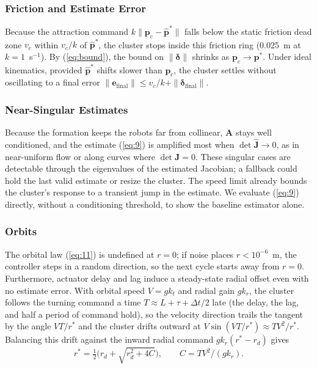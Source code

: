 \documentclass[lettersize,journal]{IEEEtran}
\begin{document}
\subsubsection{Friction and Estimate Error}
Because the attraction command $k\|\mathbf{p}_c - \hat{\mathbf{p}}^*\|$ falls below the static friction dead zone $v_c$ within $v_c/k$ of $\hat{\mathbf{p}}^*$, the cluster stops inside this friction ring (0.025~m at $k = 1$~s$^{-1}$). By (\ref{eq:bound}), the bound on $\|\boldsymbol{\delta}\|$ shrinks as $\mathbf{p}_c \to \mathbf{p}^*$. Under ideal kinematics, provided $\hat{\mathbf{p}}^*$ shifts slower than $\mathbf{p}_c$, the cluster settles without oscillating to a final error $\|\mathbf{e}_{\text{final}}\| \le v_c/k + \|\boldsymbol{\delta}_{\text{final}}\|$.

\subsubsection{Near-Singular Estimates}
Because the formation keeps the robots far from collinear, $\mathbf{A}$ stays well conditioned, and the estimate (\ref{eq:9}) is amplified most when $\det\hat{\mathbf{J}} \to 0$, as in near-uniform flow or along curves where $\det\mathbf{J} = 0$. These singular cases are detectable through the eigenvalues of the estimated Jacobian; a fallback could hold the last valid estimate or resize the cluster. The speed limit already bounds the cluster's response to a transient jump in the estimate. We evaluate (\ref{eq:9}) directly, without a conditioning threshold, to show the baseline estimator alone.

\subsubsection{Orbits}
The orbital law (\ref{eq:11}) is undefined at $r = 0$; if noise places $r < 10^{-6}$~m, the controller steps in a random direction, so the next cycle starts away from $r = 0$. Furthermore, actuator delay and lag induce a steady-state radial offset even with no estimate error. With orbital speed $V = gk_t$ and radial gain $gk_r$, the cluster follows the turning command a time $T \approx L + \tau + \Delta t/2$ late (the delay, the lag, and half a period of command hold), so the velocity direction trails the tangent by the angle $VT/r^*$ and the cluster drifts outward at $V\sin(VT/r^*) \approx TV^2/r^*$. Balancing this drift against the inward radial command $gk_r(r^* - r_d)$ gives
\begin{equation}\label{eq:orbit_cf}
r^* = \tfrac{1}{2}\bigl(r_d + \sqrt{r_d^2 + 4C}\bigr), \qquad C = TV^2/(gk_r).
\end{equation}
\end{document}

